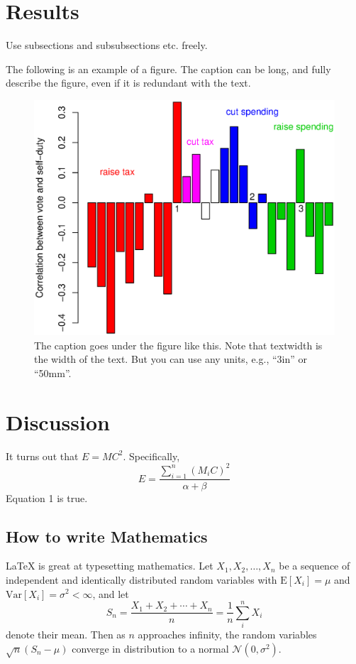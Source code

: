 \documentclass[12pt]{article}
\begin{document}
\section{Results}

Use subsections and subsubsections etc. freely.

The following is an example of a figure. The caption can be
long, and fully describe the figure, even if it is redundant with the text.

\begin{figure}[H]
\includegraphics[width=\textwidth]{dut11.eps}
\caption{The caption goes under the figure like this. Note that
  textwidth is the width of the text. But you can use any units,
  e.g., ``3in'' or ``50mm''.}
\end{figure}

\section{Discussion}
It turns out that $E = MC^2$.  Specifically,
\begin{equation}
E = \frac { \sum_{i=1}^n ( M_i C )^2 }{ \alpha + \beta }
\end{equation}
Equation 1 is true.

\subsection{How to write Mathematics}

\LaTeX{} is great at typesetting mathematics. Let $X_1, X_2, \ldots,
X_n$ be a sequence of independent and identically distributed random
variables with $\text{E}[X_i] = \mu$ and $\text{Var}[X_i] = \sigma^2 <
\infty$, and let
\[S_n = \frac{X_1 + X_2 + \cdots + X_n}{n}
      = \frac{1}{n}\sum_{i}^{n} X_i\]
denote their mean. Then as $n$ approaches infinity, the random
variables $\sqrt{n}(S_n - \mu)$ converge in distribution to a normal
$\mathcal{N}(0, \sigma^2)$.
\end{document}
